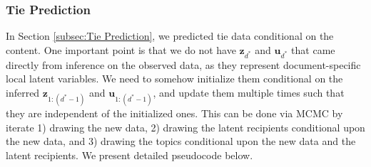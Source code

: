 \documentclass[twoside]{article}
\begin{document}
   \subsubsection{Tie Prediction} \label{subsubsec: Pseudocod for Tie Prediction}
     In Section \ref{subsec:Tie Prediction}, we predicted tie data conditional on the content. One important point is that we do not have $\boldsymbol{z}_{d^*}$ and $\boldsymbol{u}_{d^*}$ that came directly from inference on the observed data, as they represent document-specific local latent variables. We need to somehow initialize them conditional on the inferred $\boldsymbol{z}_{1:(d^*-1)}$ and $\boldsymbol{u}_{1:(d^*-1)}$, and update them multiple times such that they are independent of the initialized ones. This can be done via MCMC by iterate 1) drawing the new data, 2) drawing the latent recipients conditional upon the new data, and 3) drawing the topics conditional upon the new data and the latent recipients. We present detailed pseudocode below.
\end{document}
